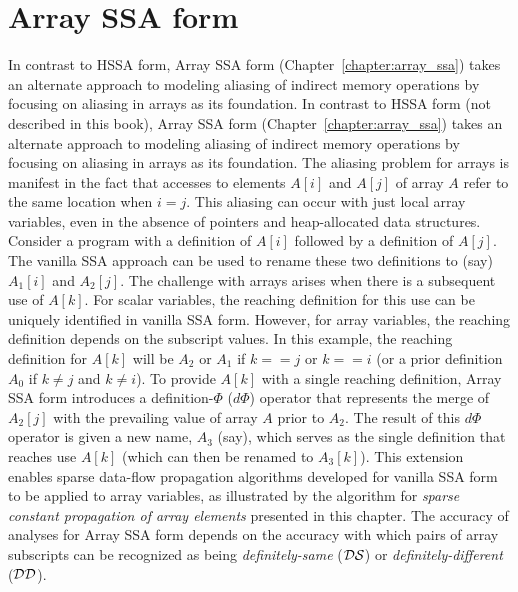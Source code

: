 \section{Array SSA form}

\ifhssa In contrast to HSSA form, Array SSA form (Chapter~\ref{chapter:array_ssa}) takes an alternate approach to modeling aliasing of indirect memory operations by focusing on aliasing in arrays as its foundation.
\else
In contrast to HSSA form (not described in this book), Array SSA form (Chapter~\ref{chapter:array_ssa}) takes an alternate approach to modeling aliasing of indirect memory operations by focusing on aliasing in arrays as its foundation.
\fi
The aliasing problem for arrays is manifest in the fact that accesses to elements $A[i]$ and $A[j]$ of array $A$ refer to the same location when $i = j$. 
This aliasing can occur with just local array variables, even in the absence of pointers and heap-allocated data structures. 
Consider a program with a definition of $A[i]$ followed by a definition of $A[j]$. 
The vanilla SSA approach can be used to rename these two definitions to (say) $A_1[i]$ and $A_2[j]$. 
The challenge with arrays arises when there is a subsequent use of $A[k]$. 
For scalar variables, the reaching definition for this use can be uniquely identified in vanilla SSA form. 
However, for array variables, the reaching definition depends on the subscript values. 
In this example, the reaching definition for $A[k]$ will be $A_2$ or $A_1$ if $k == j$ or $k == i$ (or a prior definition $A_0$ if $k \not= j$ and $k \not= i$). 
To provide $A[k]$ with a single reaching definition, Array SSA form introduces a definition-$\Phi$ ($d\Phi$) operator that represents the merge of $A_2[j]$ with the prevailing value of array $A$ prior to $A_2$. 
The result of this $d\Phi$ operator is given a new name, $A_3$ (say), which serves as the single definition that reaches use $A[k]$ (which can then be renamed to $A_3[k]$). 
This extension enables sparse data-flow propagation algorithms developed for vanilla SSA form to be applied to array variables, as illustrated by the algorithm for {\em sparse constant propagation of array elements} presented in this chapter. 
The accuracy of analyses for Array SSA form depends on the accuracy with which pairs of array subscripts can be recognized as being {\em definitely-same} (${\cal DS}$) or {\em definitely-different} (${\cal DD}$).

